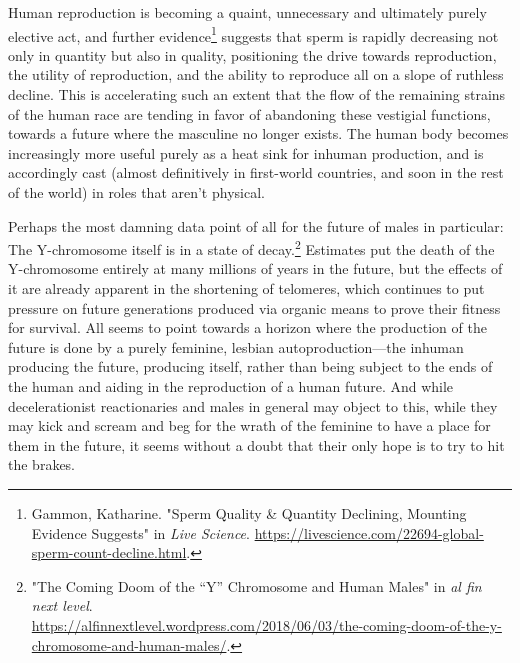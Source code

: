 \documentclass[10pt, statementpaper, twoside, openright]{memoir}
\begin{document}
Human reproduction is becoming a quaint, unnecessary and ultimately purely elective act, and further evidence\footnote{Gammon, Katharine. "Sperm Quality \& Quantity Declining, Mounting Evidence Suggests" in \textit{Live Science}. \href{https://www.livescience.com/22694-global-sperm-count-decline.html}{https://livescience.com/22694-global-sperm-count-decline.html}.} suggests that sperm is rapidly decreasing not only in quantity but also in quality, positioning the drive towards reproduction, the utility of reproduction, and the ability to reproduce all on a slope of ruthless decline. This is accelerating such an extent that the flow of the remaining strains of the human race are tending in favor of abandoning these vestigial functions, towards a future where the masculine no longer exists. The human body becomes increasingly more useful purely as a heat sink for inhuman production, and is accordingly cast (almost definitively in first-world countries, and soon in the rest of the world) in roles that aren't physical.

Perhaps the most damning data point of all for the future of males in particular: The Y-chromosome itself is in a state of decay.\footnote{"The Coming Doom of the “Y” Chromosome and Human Males" in \textit{al fin next level}.\\ \href{https://alfinnextlevel.wordpress.com/2018/06/03/the-coming-doom-of-the-y-chromosome-and-human-males/}{https://alfinnextlevel.wordpress.com/2018/06/03/the-coming-doom-of-the-y-chromosome-and-human-males/}.} Estimates put the death of the Y-chromosome entirely at many millions of years in the future, but the effects of it are already apparent in the shortening of telomeres, which continues to put pressure on future generations produced via organic means to prove their fitness for survival. All seems to point towards a horizon where the production of the future is done by a purely feminine, lesbian autoproduction---the inhuman producing the future, producing itself, rather than being subject to the ends of the human and aiding in the reproduction of a human future. And while decelerationist reactionaries and males in general may object to this, while they may kick and scream and beg for the wrath of the feminine to have a place for them in the future, it seems without a doubt that their only hope is to try to hit the brakes.
\end{document}
